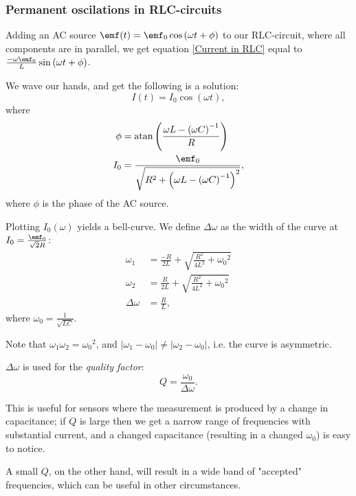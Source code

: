 \documentclass[a4paper, 12pt]{article}
\begin{document}
        \subsubsection{Permanent oscilations in RLC-circuits}

            Adding an AC source $\emf(t) = \emf_0\cos\left(\omega t + \phi\right)$ to our RLC-circuit, where all components are in parallel, 
            we get equation \ref{Current in RLC} equal to $\frac{-\omega\emf_0}{L}\sin\left(\omega t + \phi\right)$.
            
            We wave our hands, and get the following is a solution: 
            \begin{equation}
                I(t) = I_0 \cos\left(\omega t\right),
            \end{equation}
            where 
            \begin{align*}
                \phi &= \text{atan} \left(\frac{\omega L - \left(\omega C\right)^{-1}}{R}\right)\\
                I_0 &= \frac{\emf_0}{\sqrt{R^2 + \left(\omega L - \left(\omega C\right)^{-1}\right)^2}},
            \end{align*}
            where $\phi$ is the phase of the AC source.

            Plotting $I_0(\omega)$ yields a bell-curve. We define $\Delta\omega$ as the width of the curve at $I_0 = \frac{\emf_0}{\sqrt{2}R}$: 
            \begin{align*}
                \omega_1 &= \frac{-R}{2L} + \sqrt{\frac{R^2}{4L^2} + {\omega_0}^2}\\
                \omega_2 &= \frac{R}{2L} + \sqrt{\frac{R^2}{4L^2} + {\omega_0}^2}\\
                \Delta\omega &= \frac{R}{L},
            \end{align*}
            where $\omega_0 = \frac{1}{\sqrt{LC}}$.

            Note that $\omega_1\omega_2={\omega_0}^2$, and $|\omega_1 - \omega_0| \neq |\omega_2 - \omega_0|$, i.e. the curve is asymmetric.

            $\Delta\omega$ is used for the \textit{quality factor}:
            \begin{equation}
                Q = \frac{\omega_0}{\Delta\omega}.
            \end{equation}

            This is useful for sensors where the measurement is produced by a change in capacitance; 
            if $Q$ is large then we get a narrow range of frequencies with substantial current, and a changed capacitance 
            (resulting in a changed $\omega_0$) is easy to notice. 

            A small $Q$, on the other hand, will result in a wide band of "accepted" frequencies, which can be useful in other circumstances.
        
        
\end{document}
